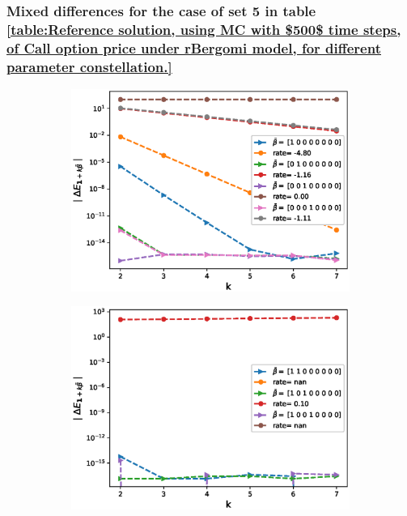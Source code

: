 \documentclass[11pt]{article}
\begin{document}
\subsubsection{Mixed differences for the case of set 5 in table \ref{table:Reference solution, using MC with $500$ time steps, of Call option price under rBergomi model, for different parameter constellation.}}\label{Mixed differences for the case of set 5,linear}

\begin{figure}[h!]
	\centering
	
	\begin{subfigure}{.4\textwidth}
		\centering
		\includegraphics[width=1\linewidth]{./figures/rBergomi_mixed_error_rates/with_linear_hierarchy/N_4/H_002/first_difference_rbergomi_4steps_H_002_K_1_totally_hierarch_with_rate_W1}
		\caption{}
		\label{fig:sub3}
	\end{subfigure}%
	\begin{subfigure}{.4\textwidth}
		\centering
		\includegraphics[width=1\linewidth]{./figures/rBergomi_mixed_error_rates/with_linear_hierarchy/N_4/H_002/mixed_difference_order2_rbergomi_4steps_H_002_K_1_totally_hierarch_with_rate_W1}
		\caption{}
		\label{fig:sub3}
	\end{subfigure}%
	

\end{figure}
\end{document}
